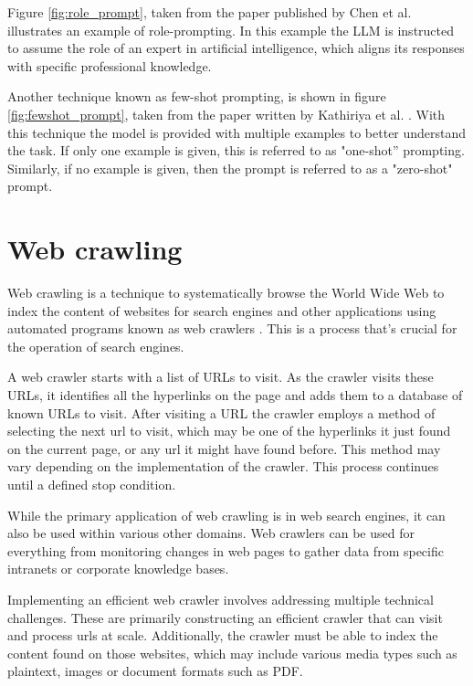 Figure \ref{fig:role_prompt}, taken from the paper published by Chen et al. \cite{chen_unleashing_2023} illustrates an example of role-prompting. In this example the \gls{LLM} is instructed to assume the role of an expert in artificial intelligence, which aligns its responses with specific professional knowledge.





Another technique known as few-shot prompting, is shown in figure \ref{fig:fewshot_prompt}, taken from the paper written by Kathiriya et al. \cite{kathiriya_power_2023}. With this technique the model is provided with multiple examples to better understand the task. If only one example is given, this is referred to as "one-shot” prompting. Similarly, if no example is given, then the prompt is referred to as a "zero-shot" prompt.





\section{Web crawling}


Web crawling is a technique to systematically browse the World Wide Web to index the content of websites for search engines and other applications using automated programs known as web crawlers \cite{pant_crawling_2003, liu_web_2009}. This is a process that’s crucial for the operation of search engines.


A web crawler starts with a list of URLs to visit. As the crawler visits these URLs, it identifies all the hyperlinks on the page and adds them to a database of known URLs to visit. After visiting a URL the crawler employs a method of selecting the next url to visit, which may be one of the hyperlinks it just found on the current page, or any url it might have found before. This method may vary depending on the implementation of the crawler. This process continues until a defined stop condition.


While the primary application of web crawling is in web search engines, it can also be used within various other domains. Web crawlers can be used for everything from monitoring changes in web pages to gather data from specific intranets or corporate knowledge bases.


Implementing an efficient web crawler involves addressing multiple technical challenges. These are primarily constructing an efficient crawler that can visit and process urls at scale. Additionally, the crawler must be able to index the content found on those websites, which may include various media types such as plaintext, images or document formats such as PDF.






